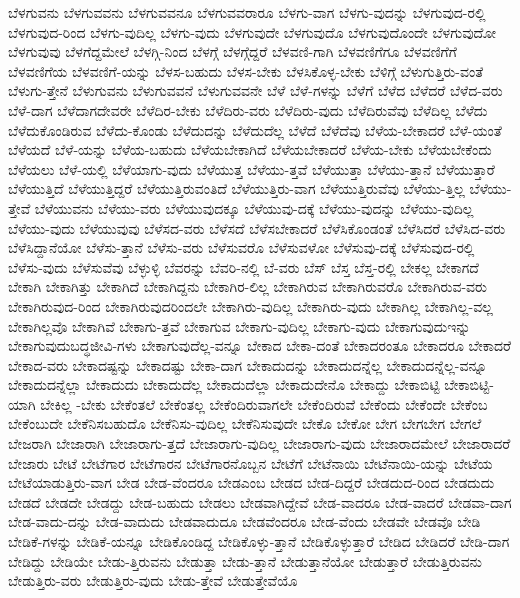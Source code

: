{ಬೆಳಗುವನು
ಬೆಳಗುವವನು
ಬೆಳಗುವವನೂ
ಬೆಳಗುವವರಾರೂ
ಬೆಳಗು-ವಾಗ
ಬೆಳಗು-ವುದನ್ನು
ಬೆಳಗುವುದ-ರಲ್ಲಿ
ಬೆಳಗುವುದ-ರಿಂದ
ಬೆಳಗು-ವುದಿಲ್ಲ
ಬೆಳಗು-ವುದು
ಬೆಳಗುವುದೇ
ಬೆಳಗುವುದೊ
ಬೆಳಗುವುದೊಂದೇ
ಬೆಳಗುವುದೋ
ಬೆಳಗುವುವು
ಬೆಳಗೆದ್ದಮೇಲೆ
ಬೆಳಗ್ಗಿ-ನಿಂದ
ಬೆಳಗ್ಗೆ
ಬೆಳಗ್ಗೆದ್ದರೆ
ಬೆಳವಣಿ-ಗಾಗಿ
ಬೆಳವಣಿಗೆಗೂ
ಬೆಳವಣಿಗೆಗೆ
ಬೆಳವಣಿಗೆಯ
ಬೆಳವಣಿಗೆ-ಯನ್ನು
ಬೆಳಸ-ಬಹುದು
ಬೆಳಸ-ಬೇಕು
ಬೆಳಸಿಕೊಳ್ಳ-ಬೇಕು
ಬೆಳಿಗ್ಗೆ
ಬೆಳುಗುತ್ತಿರು-ವಂತೆ
ಬೆಳುಗು-ತ್ತೇನೆ
ಬೆಳುಗುವನು
ಬೆಳುಗುವವನೆ
ಬೆಳುಗುವವನೇ
ಬೆಳೆ
ಬೆಳೆ-ಗಳನ್ನು
ಬೆಳೆಗೆ
ಬೆಳೆದ
ಬೆಳೆದರೆ
ಬೆಳೆದ-ವರು
ಬೆಳೆ-ದಾಗ
ಬೆಳೆದಾಗದೇವರೇ
ಬೆಳೆದಿರ-ಬೇಕು
ಬೆಳೆದಿರು-ವರು
ಬೆಳೆದಿರು-ವುದು
ಬೆಳೆದಿರುವೆವು
ಬೆಳೆದಿಲ್ಲ
ಬೆಳೆದು
ಬೆಳೆದುಕೊಂಡಿರುವ
ಬೆಳೆದು-ಕೊಂಡು
ಬೆಳೆದುದನ್ನು
ಬೆಳೆದುದೆಲ್ಲ
ಬೆಳೆದೆ
ಬೆಳೆದೆವು
ಬೆಳೆಯ-ಬೇಕಾದರೆ
ಬೆಳೆ-ಯಂತೆ
ಬೆಳೆಯದೆ
ಬೆಳೆ-ಯನ್ನು
ಬೆಳೆಯ-ಬಹುದು
ಬೆಳೆಯಬೇಕಾಗಿದೆ
ಬೆಳೆಯಬೇಕಾದರೆ
ಬೆಳೆಯ-ಬೇಕು
ಬೆಳೆಯಬೇಕೆಂದು
ಬೆಳೆಯಲು
ಬೆಳೆ-ಯಲ್ಲಿ
ಬೆಳೆಯಾಗು-ವುದು
ಬೆಳೆಯುತ್ತ
ಬೆಳೆಯು-ತ್ತವೆ
ಬೆಳೆಯುತ್ತಾ
ಬೆಳೆಯು-ತ್ತಾನೆ
ಬೆಳೆಯುತ್ತಾರೆ
ಬೆಳೆಯುತ್ತಿದೆ
ಬೆಳೆಯುತ್ತಿದ್ದರೆ
ಬೆಳೆಯುತ್ತಿರುವಂತಿದೆ
ಬೆಳೆಯುತ್ತಿರು-ವಾಗ
ಬೆಳೆಯುತ್ತಿರುವೆವು
ಬೆಳೆಯು-ತ್ತಿಲ್ಲ
ಬೆಳೆಯು-ತ್ತೇವೆ
ಬೆಳೆಯುವನು
ಬೆಳೆಯು-ವರು
ಬೆಳೆಯುವುದಕ್ಕೂ
ಬೆಳೆಯುವು-ದಕ್ಕೆ
ಬೆಳೆಯು-ವುದನ್ನು
ಬೆಳೆಯು-ವುದಿಲ್ಲ
ಬೆಳೆಯು-ವುದು
ಬೆಳೆಯುವುವು
ಬೆಳೆಸದ-ವರು
ಬೆಳೆಸದೆ
ಬೆಳೆಸಬೇಕಾದರೆ
ಬೆಳೆಸಿಕೊಂಡಂತೆ
ಬೆಳೆಸಿದರೆ
ಬೆಳೆಸಿದ-ವರು
ಬೆಳೆಸಿದ್ದಾನೆಯೋ
ಬೆಳೆಸು-ತ್ತಾನೆ
ಬೆಳೆಸು-ವರು
ಬೆಳೆಸುವರೊ
ಬೆಳೆಸುವಳೋ
ಬೆಳೆಸುವು-ದಕ್ಕೆ
ಬೆಳೆಸುವುದ-ರಲ್ಲಿ
ಬೆಳೆಸು-ವುದು
ಬೆಳೆಸುವೆವು
ಬೆಳ್ಳುಳ್ಳಿ
ಬೆವರನ್ನು
ಬೆವರಿ-ನಲ್ಲಿ
ಬೆ-ವರು
ಬೆಸ್
ಬೆಸ್ತ
ಬೆಸ್ತ-ರಲ್ಲಿ
ಬೇಕಲ್ಲ
ಬೇಕಾಗದೆ
ಬೇಕಾಗಿ
ಬೇಕಾಗಿತ್ತು
ಬೇಕಾಗಿದೆ
ಬೇಕಾಗಿದ್ದನು
ಬೇಕಾಗಿರ-ಲಿಲ್ಲ
ಬೇಕಾಗಿರುವ
ಬೇಕಾಗಿರುವರೊ
ಬೇಕಾಗಿರುವ-ವರು
ಬೇಕಾಗಿರುವುದ-ರಿಂದ
ಬೇಕಾಗಿರುವುದರಿಂದಲೇ
ಬೇಕಾಗಿರು-ವುದಿಲ್ಲ
ಬೇಕಾಗಿರು-ವುದು
ಬೇಕಾಗಿಲ್ಲ
ಬೇಕಾಗಿಲ್ಲ-ವಲ್ಲ
ಬೇಕಾಗಿಲ್ಲವೊ
ಬೇಕಾಗಿವೆ
ಬೇಕಾಗು-ತ್ತವೆ
ಬೇಕಾಗುವ
ಬೇಕಾಗು-ವುದಿಲ್ಲ
ಬೇಕಾಗು-ವುದು
ಬೇಕಾಗುವುದುಇನ್ನು
ಬೇಕಾಗುವುದುಬದ್ಧಜೀವಿ-ಗಳು
ಬೇಕಾಗುವುದೆಲ್ಲ-ವನ್ನೂ
ಬೇಕಾದ
ಬೇಕಾ-ದಂತೆ
ಬೇಕಾದರಂತೂ
ಬೇಕಾದರೂ
ಬೇಕಾದರೆ
ಬೇಕಾದ-ವರು
ಬೇಕಾದಷ್ಟನ್ನು
ಬೇಕಾದಷ್ಟು
ಬೇಕಾ-ದಾಗ
ಬೇಕಾದುದನ್ನು
ಬೇಕಾದುದನ್ನೆಲ್ಲ
ಬೇಕಾದುದನ್ನೆಲ್ಲ-ವನ್ನೂ
ಬೇಕಾದುದನ್ನೆಲ್ಲಾ
ಬೇಕಾದುದು
ಬೇಕಾದುದೆಲ್ಲ
ಬೇಕಾದುದೆಲ್ಲಾ
ಬೇಕಾದುದೇನೊ
ಬೇಕಾದ್ದು
ಬೇಕಾಬಿಟ್ಟಿ
ಬೇಕಾಬಿಟ್ಟಿ-ಯಾಗಿ
ಬೇಕಿಲ್ಲ
-ಬೇಕು
ಬೇಕೆಂತಲೆ
ಬೇಕೆಂತಲ್ಲ
ಬೇಕೆಂದಿರುವಾಗಲೇ
ಬೇಕೆಂದಿರುವೆ
ಬೇಕೆಂದು
ಬೇಕೆಂದೇ
ಬೇಕೆಂಬ
ಬೇಕೆಂಬುದೇ
ಬೇಕೆನಿಸಬಹುದೊ
ಬೇಕೆನಿಸು-ವುದಿಲ್ಲ
ಬೇಕೆನಿಸುವುದೇ
ಬೇಕೊ
ಬೇಕೋ
ಬೇಗ
ಬೇಗಬೇಗ
ಬೇಗಲೆ
ಬೇಜರಾಗಿ
ಬೇಜಾರಾಗಿ
ಬೇಜಾರಾಗು-ತ್ತದೆ
ಬೇಜಾರಾಗು-ವುದಿಲ್ಲ
ಬೇಜಾರಾಗು-ವುದು
ಬೇಜಾರಾದಮೇಲೆ
ಬೇಜಾರಾದರೆ
ಬೇಜಾರು
ಬೇಟೆ
ಬೇಟೆಗಾರ
ಬೇಟೆಗಾರನ
ಬೇಟೆಗಾರನೊಬ್ಬನ
ಬೇಟೆಗೆ
ಬೇಟೆನಾಯಿ
ಬೇಟೆನಾಯಿ-ಯನ್ನು
ಬೇಟೆಯ
ಬೇಟೆಯಾಡುತ್ತಿರು-ವಾಗ
ಬೇಡ
ಬೇಡ-ವೆಂದರೂ
ಬೇಡಎಂಬ
ಬೇಡದ
ಬೇಡ-ದಿದ್ದರೆ
ಬೇಡದುದ-ರಿಂದ
ಬೇಡದುದು
ಬೇಡದೆ
ಬೇಡದೇ
ಬೇಡದ್ದು
ಬೇಡ-ಬಹುದು
ಬೇಡಲು
ಬೇಡವಾಗಿದ್ದೇವೆ
ಬೇಡ-ವಾದರೂ
ಬೇಡ-ವಾದರೆ
ಬೇಡವಾ-ದಾಗ
ಬೇಡ-ವಾದು-ದನ್ನು
ಬೇಡ-ವಾದುದು
ಬೇಡವಾದುದೂ
ಬೇಡವೆಂದರೂ
ಬೇಡ-ವೆಂದು
ಬೇಡವೇ
ಬೇಡವೊ
ಬೇಡಿ
ಬೇಡಿಕೆ-ಗಳನ್ನು
ಬೇಡಿಕೆ-ಯನ್ನೂ
ಬೇಡಿಕೊಂಡಿದ್ದ
ಬೇಡಿಕೊಳ್ಳು-ತ್ತಾನೆ
ಬೇಡಿಕೊಳ್ಳುತ್ತಾರೆ
ಬೇಡಿದ
ಬೇಡಿದರೆ
ಬೇಡಿ-ದಾಗ
ಬೇಡಿದ್ದು
ಬೇಡಿಯೇ
ಬೇಡು-ತ್ತಿರುವನು
ಬೇಡುತ್ತಾ
ಬೇಡು-ತ್ತಾನೆ
ಬೇಡುತ್ತಾನೆಯೋ
ಬೇಡುತ್ತಾರೆ
ಬೇಡುತ್ತಿರುವನು
ಬೇಡುತ್ತಿರು-ವರು
ಬೇಡುತ್ತಿರು-ವುದು
ಬೇಡು-ತ್ತೇವೆ
ಬೇಡುತ್ತೇವೆಯೊ
}
